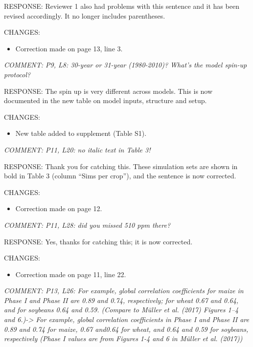 \documentclass[gmd, manuscript]{copernicus} %
\begin{document}
RESPONSE: Reviewer 1 also had problems with this sentence and it has been revised accordingly. It no longer includes parentheses.
\smallskip

CHANGES:
\begin{itemize}
    \item Correction made on page 13, line 3.
\end{itemize}

\smallskip

\textcolor{dark-gray}{\textit{COMMENT: P9, L8: 30-year or 31-year (1980-2010)? What’s the model spin-up protocol?}}

RESPONSE: The spin up is very different across models. This is now documented in the new table on model inputs, structure and setup.
\smallskip

CHANGES:
\begin{itemize}
    \item New table added to supplement (Table S1).
\end{itemize}

\smallskip

\textcolor{dark-gray}{\textit{COMMENT: P11, L20: no italic text in Table 3!}}

RESPONSE: Thank you for catching this. These simulation sets are shown in bold in Table 3 (column “Sims per crop”), and the sentence is now corrected.
\smallskip

CHANGES:
\begin{itemize}
    \item Correction made on page 12.
\end{itemize}

\smallskip

\textcolor{dark-gray}{\textit{COMMENT: P11, L28: did you missed 510 ppm there?}}

RESPONSE: Yes, thanks for catching this; it is now corrected.
\smallskip

CHANGES:
\begin{itemize}
    \item Correction made on page 11, line 22.
\end{itemize}

\smallskip

\textcolor{dark-gray}{\textit{COMMENT: P13, L26: For example, global correlation coefficients for maize in Phase I and Phase II are 0.89 and 0.74, respectively; for wheat 0.67 and 0.64, and for soybeans 0.64 and 0.59. (Compare to Müller et al. (2017) Figures 1–4 and 6.)-> For example, global correlation coefficients in Phase I and Phase II are 0.89 and 0.74 for maize, 0.67 and0.64 for wheat, and 0.64 and 0.59 for soybeans, respectively (Phase I values are from Figures 1-4 and 6 in Müller et al. (2017))}}
\end{document}
